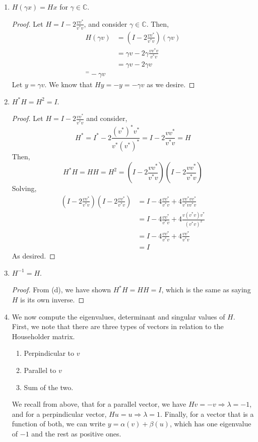 \documentclass[letterpaper,10pt]{article}
\newcommand{\C}{\mathbb{C}}
\begin{document}
\begin{description}
\begin{enumerate}[label=\alph*.]
\begin{proof}
\begin{align*}
Hu &= (I-2\frac{vv^*}{v^*v})u\\
&=u-2\frac{vv^*u}{v^*v}&&\text{Note that }v^*u=0\\
&=u
\end{align*}
\end{proof}
\item $H(\gamma x)=Hx$ for $\gamma \in \C$.
\begin{proof}
Let $H=I-2\frac{vv^*}{v^*v}$, and consider $\gamma \in \C$. Then,
\begin{align*}
H(\gamma v) &= (I-2\frac{vv^*}{v^*v})(\gamma v)\\
&= \gamma v-2\gamma \frac{vv^*v}{v^*v}\\
&=\gamma v-2\gamma v\\
^= -\gamma v
\end{align*}
Let $y=\gamma v$. We know that $Hy=-y=-\gamma v$ as we desire.
\end{proof}
\item $H^* H=H^2=I$.
\begin{proof}
Let $H=I-2\frac{vv^*}{v^*v}$ and consider,
\[H^*=I^*-2\frac{(v^*)^* v^*}{v^*(v^*)^*}=I-2\frac{vv^*}{v^*v}=H\]
Then,
\[H^*H=HH=H^2=(I-2\frac{vv^*}{v^*v})(I-2\frac{vv^*}{v^*v})\]
Solving,
\begin{align*}
(I-2\frac{vv^*}{v^*v})(I-2\frac{vv^*}{v^*v})&=I-4\frac{vv^*}{v^*v}+4\frac{vv^*vv^*}{v^*vv^*v}\\
&=I-4\frac{vv^*}{v^*v}+4\frac{v(v^*v)v^*}{(v^*v)^2}\\
&=I-4\frac{vv^*}{v^*v}+4\frac{vv^*}{v^*v}\\
&=I
\end{align*}
As desired.
\end{proof}
\item $H^{-1}=H$.
\begin{proof}
From (d), we have shown $H^*H=HH=I$, which is the same as saying $H$ is its own inverse.
\end{proof}
\item We now compute the eigenvalues, determinant and singular values of $H$. First, we note that there are three types of vectors in relation to the Householder matrix.
\begin{enumerate}
\item Perpindicular to $v$
\item Parallel to $v$
\item Sum of the two.
\end{enumerate}
We recall from above, that for a parallel vector, we have $Hv=-v\Rightarrow \lambda=-1$, and for a perpindicular vector, $Hu=u\Rightarrow \lambda=1$. Finally, for a vector that is a function of both, we can write $y=\alpha(v)+\beta(u)$, which has one eigenvalue of $-1$ and the rest as positive ones.\\

\end{enumerate}
\end{description}
\end{document}
